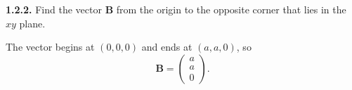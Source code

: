 \documentclass{article}
\begin{document}
\textbf{1.2.2.} Find the vector $\mathbf{B}$ from the origin to the opposite corner that lies in the $xy$ plane.

The vector begins at $(0,0,0)$ and ends at $(a,a,0)$, so \[\mathbf{B} = \begin{pmatrix} a \\ a \\ 0 \end{pmatrix}.\]
\end{document}
